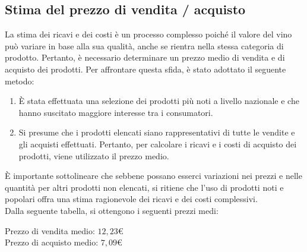 \documentclass[12pt, a4paper]{article}
\newcommand{\meskip}{\medskip \\}
\begin{document}
\subsection{Stima del prezzo di vendita / acquisto}
La stima dei ricavi e dei costi è un processo complesso poiché il valore del vino può variare in base alla sua qualità, anche se rientra nella stessa categoria di prodotto. Pertanto, è necessario determinare un prezzo medio di vendita e di acquisto dei prodotti. Per affrontare questa sfida, è stato adottato il seguente metodo:
\begin{enumerate}
    \item È stata effettuata una selezione dei prodotti più noti a livello nazionale e che hanno suscitato maggiore interesse tra i consumatori.
    \item Si presume che i prodotti elencati siano rappresentativi di tutte le vendite e gli acquisti effettuati. Pertanto, per calcolare i ricavi e i costi di acquisto dei prodotti, viene utilizzato il prezzo medio.
\end{enumerate}
È importante sottolineare che sebbene possano esserci variazioni nei prezzi e nelle quantità per altri prodotti non elencati, si ritiene che l'uso di prodotti noti e popolari offra una stima ragionevole dei ricavi e dei costi complessivi.\meskip
Dalla seguente tabella, si ottengono i seguenti prezzi medi:
\begin{center}
    Prezzo di vendita medio: $12,23$€\\
    Prezzo di acquisto medio: $7,09$€
\end{center}
\end{document}
